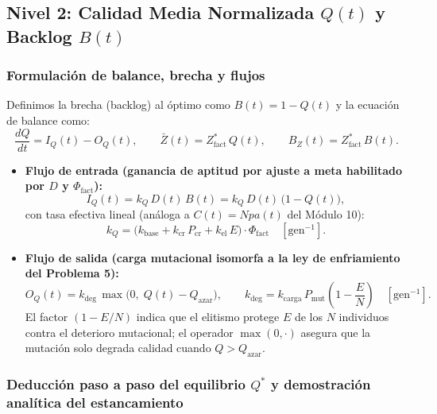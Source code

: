 \documentclass[11pt,a4paper]{article}
\begin{document}
\subsection{Nivel 2: Calidad Media Normalizada $Q(t)$ y Backlog $B(t)$}

\subsubsection{Formulaci\'on de balance, brecha y flujos}
Definimos la brecha (backlog) al \'optimo como $B(t) = 1 - Q(t)$ y la ecuaci\'on de balance como:
\begin{equation}
\frac{dQ}{dt} = I_Q(t) - O_Q(t), \qquad \bar{Z}(t) = Z^*_{\text{fact}}\,Q(t), \qquad B_Z(t) = Z^*_{\text{fact}}\,B(t).
\end{equation}
\begin{itemize}[leftmargin=1.5em]
    \item \textbf{Flujo de entrada (ganancia de aptitud por ajuste a meta habilitado por $D$ y $\Phi_{\text{fact}}$):}
    \begin{equation}
    I_Q(t) = k_Q\,D(t)\,B(t) = k_Q\,D(t)\,\big(1 - Q(t)\big),
    \end{equation}
    con tasa efectiva lineal (an\'aloga a $C(t) = N p a(t)$ del M\'odulo 10):
    \begin{equation}
    k_Q = \big(k_{\text{base}} + k_{\text{cr}}\,P_{\text{cr}} + k_{\text{el}}\,E\big)\cdot \Phi_{\text{fact}} \quad [\text{gen}^{-1}].
    \end{equation}
    \item \textbf{Flujo de salida (carga mutacional isomorfa a la ley de enfriamiento del Problema 5):}
    \begin{equation}
    O_Q(t) = k_{\text{deg}}\,\max\!\big(0,\; Q(t) - Q_{\text{azar}}\big), \qquad
    k_{\text{deg}} = k_{\text{carga}}\,P_{\text{mut}}\left(1 - \frac{E}{N}\right) \quad [\text{gen}^{-1}].
    \end{equation}
    El factor $(1 - E/N)$ indica que el elitismo protege $E$ de los $N$ individuos contra el deterioro mutacional; el operador $\max(0,\cdot)$ asegura que la mutaci\'on solo degrada calidad cuando $Q > Q_{\text{azar}}$.
\end{itemize}

\subsubsection{Deducci\'on paso a paso del equilibrio $Q^*$ y demostraci\'on anal\'itica del estancamiento}
\end{document}
